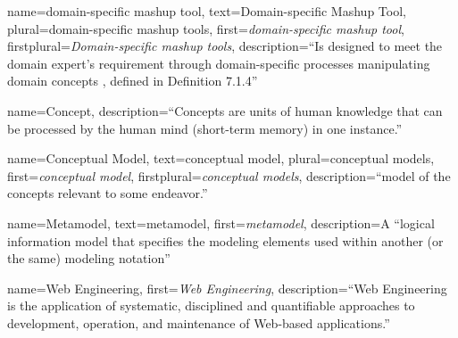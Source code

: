  {
  name=domain-specific mashup tool,
  text=Domain-specific Mashup Tool,
  plural=domain-specific mashup tools,
  first={\emph{domain-specific mashup tool}}, 
  firstplural={\emph{Domain-specific mashup tools}}, 
  description={``Is designed to meet the domain expert’s requirement  through domain-specific processes manipulating domain concepts \autocite{Chemnitz2017}, defined in Definition 7.1.4''}
}

 {
  name=Concept,
  description={``Concepts are units of human knowledge that can be processed by the human mind (short-term memory) in one instance.'' \autocite{}}
}

 {
  name=Conceptual Model,
  text=conceptual model,
    plural=conceptual models,
    first={\emph{conceptual model}}, 
    firstplural={\emph{conceptual models}}, 
  description={``model of the concepts relevant to some endeavor.'' \autocite{Chemnitz2017}}
}


 {
  name=Metamodel,
  text=metamodel,
  first={\emph{metamodel}}, 
  description={A ``logical information model that specifies the modeling elements used within another (or the same) modeling notation'' \autocite[][entry 3.2433]{ISO/IEEE24765Vocabulary}}
}

 {
  name=Web Engineering,
  first={\emph{Web Engineering}},
  description={``Web Engineering is the application of systematic, disciplined and quantifiable approaches to development, operation, and maintenance of Web-based applications.'' \autocite{Deshpande2002WebEngineering}}
}

